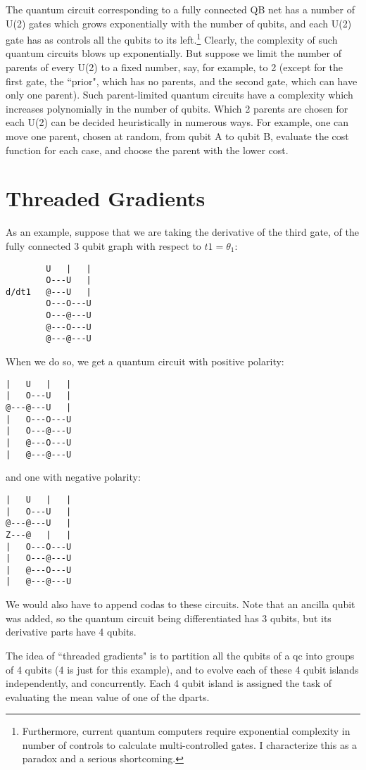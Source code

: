 \documentclass[12pt]{article}
\begin{document}
{The quantum circuit corresponding to
a  fully connected QB net has a
number of U(2) gates which grows
exponentially with the number of qubits,
and each U(2) gate
has as controls all the qubits
to its left.\footnote{Furthermore, current quantum computers
require exponential complexity
in number of controls to
calculate multi-controlled gates. I
characterize this as a paradox and
a serious shortcoming.} Clearly,
the complexity of
such quantum circuits blows
up exponentially. But suppose we limit
the number of parents of every U(2)
to a fixed number, say, for example, to 2 (except for
the first gate, the ``prior",
 which has no parents, and the second gate,
 which can have only one parent).
 Such parent-limited quantum circuits
 have a complexity
 which increases
 polynomially
 in the number of qubits.
 Which 2 parents are chosen for each U(2)
 can be decided heuristically
in numerous ways. For example,
one can move one parent, chosen at random,
from qubit A to qubit B,
evaluate the cost function
for each case, and choose the parent
with the lower cost.

\section{Threaded Gradients}
As an example,
suppose
that we are taking the derivative
of the third gate,
of the fully connected 3 qubit graph
with respect to $t1 =\theta_1$:

\begin{verbatim}
        U   |   |
        O---U   |
d/dt1   @---U   |
        O---O---U
        O---@---U
        @---O---U
        @---@---U
\end{verbatim}
When we do so,
we get
a quantum circuit with positive
polarity:

\begin{verbatim}
|   U   |   |
|   O---U   |
@---@---U   |
|   O---O---U
|   O---@---U
|   @---O---U
|   @---@---U
\end{verbatim}
and one with negative polarity:

\begin{verbatim}
|   U   |   |
|   O---U   |
@---@---U   |
Z---@   |   |
|   O---O---U
|   O---@---U
|   @---O---U
|   @---@---U
\end{verbatim}
We would also have to
append codas to these circuits.
Note that an ancilla qubit was added,
so the quantum circuit being
differentiated has 3 qubits,
but its derivative parts have 4 qubits.


The idea of ``threaded gradients"
is to partition
all the qubits of a qc into
groups of 4 qubits (4 is just for this example),
and to evolve
each of these 4 qubit islands
independently,
and concurrently.
Each 4 qubit island
is assigned
the task of
evaluating the mean value
of one of the dparts.

}
\end{document}
